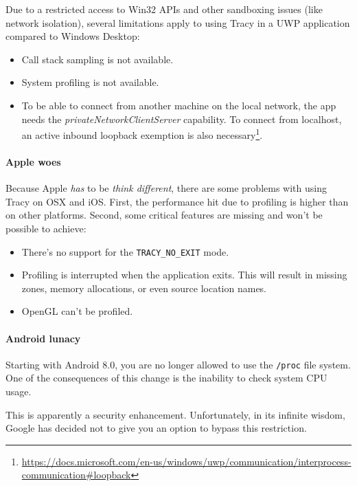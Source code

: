 \documentclass[hidelinks,titlepage,a4paper]{article}
\begin{document}
Due to a restricted access to Win32 APIs and other sandboxing issues (like network isolation), several limitations apply to using Tracy in a UWP application compared to Windows Desktop:

\begin{itemize}
\item Call stack sampling is not available.
\item System profiling is not available.
\item To be able to connect from another machine on the local network, the app needs the \emph{privateNetworkClientServer} capability. To connect from localhost, an active inbound loopback exemption is also necessary\footnote{\url{https://docs.microsoft.com/en-us/windows/uwp/communication/interprocess-communication\#loopback}}.
\end{itemize}

\paragraph{Apple woes}

Because Apple \emph{has} to be \emph{think different}, there are some problems with using Tracy on OSX and iOS. First, the performance hit due to profiling is higher than on other platforms. Second, some critical features are missing and won't be possible to achieve:

\begin{itemize}
\item There's no support for the \texttt{TRACY\_NO\_EXIT} mode.
\item Profiling is interrupted when the application exits. This will result in missing zones, memory allocations, or even source location names.
\item OpenGL can't be profiled.
\end{itemize}

\paragraph{Android lunacy}
\label{androidlunacy}

Starting with Android 8.0, you are no longer allowed to use the \texttt{/proc} file system. One of the consequences of this change is the inability to check system CPU usage.

This is apparently a security enhancement. Unfortunately, in its infinite wisdom, Google has decided not to give you an option to bypass this restriction.
\end{document}
